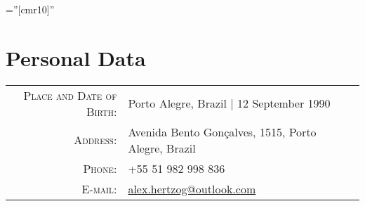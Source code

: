 \documentclass[a4paper,10pt]{article}
\begin{document}
\pagestyle{empty} %

\font\fb=''[cmr10]'' %

\par{\bigskip\par}
    
\section{Personal Data}

\begin{tabular}{rl}
    \textsc{Place and Date of Birth:} & Porto Alegre, Brazil  | 12 September 1990 \\
    \textsc{Address:}   & Avenida Bento Gonçalves, 1515, Porto Alegre, Brazil \\
    \textsc{Phone:}     & +55 51 982 998 836\\
    \textsc{E-mail:}     & \href{mailto:alex.hertzog@outlook.com}{alex.hertzog@outlook.com}
\end{tabular}
\end{document}
